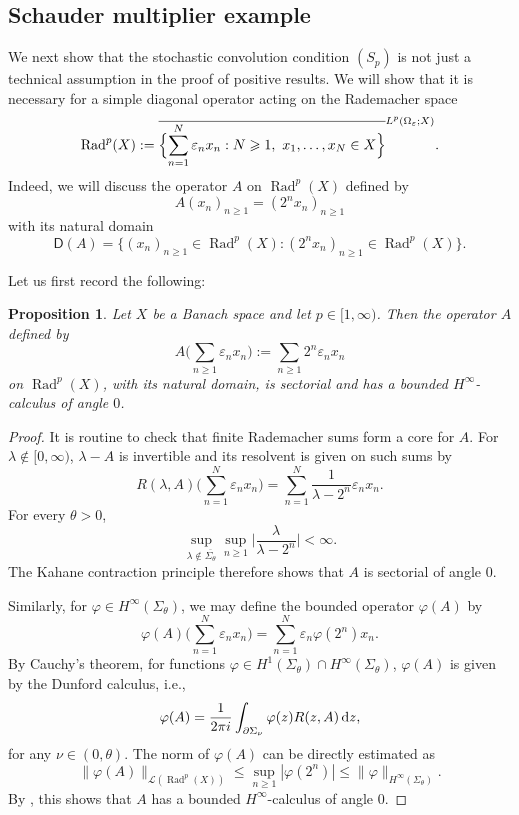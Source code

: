 \documentclass{amsart}
\let\le\leqslant
\let\leq\leqslant
\let\geq\geqslant
\theoremstyle{plain}
\theoremstyle{remark}
\theoremstyle{plain}
\newtheorem{proposition}[theorem]{Proposition}
\numberwithin{equation}{section}
\newcommand{\1}{\mathbf 1}
\newcommand{\dd}{\,{\rm d}}
\newcommand{\Rad}{\operatorname{Rad}}
\newcommand{\Dom}{\mathsf{D}}
\begin{document}
\subsection{Schauder multiplier example}\label{ss:Schauder}
We next show that the stochastic convolution condition $(S_p)$ is not just  a technical assumption in the proof of positive results. We will show that it is necessary for a simple diagonal operator acting on the Rademacher space
\[
\Rad^p(X):=
\overline{\Bigl\{
\sum_{n=1}^N\varepsilon_nx_n:
N\geq1,\ x_1,\ldots,x_N\in X
\Bigr\}}^{L^p(\Omega_\varepsilon;X)}.
\] 
Indeed, we will discuss the operator $A$ on $\Rad^p(X)$  defined by
\begin{equation}\label{eq:Arad}
A (x_n)_{n\geq 1} = (2^n x_n)_{n\geq 1}
\end{equation}
with its natural domain
\[\Dom(A) = \bigl\{(x_n)_{n\geq 1}\in \Rad^p(X): (2^n x_n)_{n\geq 1}\in \Rad^p(X)\bigr\}.\]

Let us first record the following: 

\begin{proposition}\label{prop:HinftyRad}
Let $X$ be a Banach space and let $p\in[1,\infty)$. Then the
operator $A$ defined by
\[
        A\Big(\sum_{n\geq1}\varepsilon_nx_n\Big)
        :=
        \sum_{n\geq1}2^n\varepsilon_nx_n
\]
on $\Rad^p(X)$, with its natural domain, is sectorial and has a
bounded $H^\infty$-calculus of angle $0$.
\end{proposition}

\begin{proof} It is routine to check that finite Rademacher sums form a core for $A$. For
$\lambda\notin[0,\infty)$, $\lambda - A$ is invertible and its resolvent is given on such sums by
\[
        R(\lambda,A)
        \Big(\sum_{n=1}^N\varepsilon_nx_n\Big)
        =
        \sum_{n=1}^N
        \frac{1}{\lambda-2^n}\varepsilon_nx_n.
\]
For every $\theta>0$,
\[
        \sup_{\lambda\notin\overline{\Sigma_\theta}}
        \sup_{n\geq1}
        \Big|\frac{\lambda}{\lambda-2^n}\Big|
        <\infty.
\]
The Kahane contraction principle therefore shows that $A$ is sectorial of angle $0$.

Similarly, for $\varphi\in H^\infty(\Sigma_\theta)$, we may define the bounded operator $\varphi(A)$ by
\[
        \varphi(A)
        \Big(\sum_{n=1}^N\varepsilon_nx_n\Big)
        =
        \sum_{n=1}^N\varepsilon_n\varphi(2^n)x_n.
\]
By Cauchy's theorem, for functions $\varphi \in H^1(\Sigma_\theta)\cap H^\infty(\Sigma_\theta)$, $\varphi(A)$ is given by the Dunford calculus, i.e.,
$$ \varphi(A) = \frac1{2\pi i} \int_{\partial \Sigma_\nu} \varphi(z) R(z,A)\dd z,$$
for any $\nu\in (0,\theta)$. The norm of $\varphi(A)$ can be directly estimated as
\[
        \|\varphi(A)\|_{\mathscr L(\Rad^p(X))}
        \le
        \sup_{n\geq1}|\varphi(2^n)|
        \leq
        \|\varphi\|_{H^\infty(\Sigma_\theta)}.
\]
By \cite[Definition 10.2.20]{HNVW2}, this shows that $A$ has a bounded $H^\infty$-calculus of angle $0$.
\end{proof}
\end{document}
